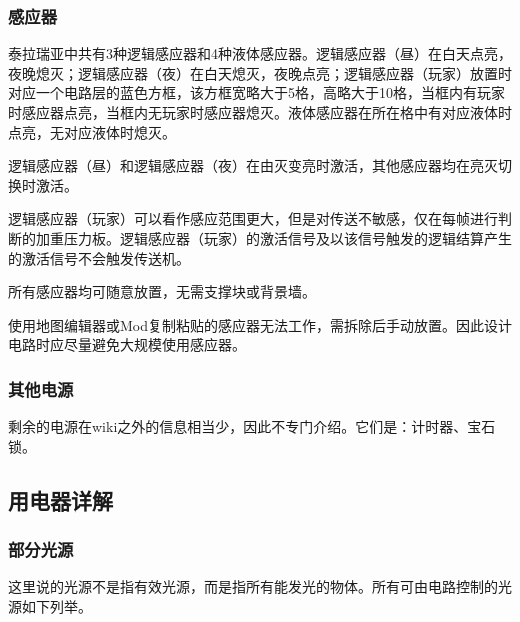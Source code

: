 \subsubsection{感应器}
泰拉瑞亚中共有3种逻辑感应器和4种液体感应器。逻辑感应器（昼）在白天点亮，夜晚熄灭；逻辑感应器（夜）在白天熄灭，夜晚点亮；逻辑感应器（玩家）放置时对应一个电路层的蓝色方框，该方框宽略大于5格，高略大于10格，当框内有玩家时感应器点亮，当框内无玩家时感应器熄灭。液体感应器在所在格中有对应液体时点亮，无对应液体时熄灭。

逻辑感应器（昼）和逻辑感应器（夜）在由灭变亮时激活，其他感应器均在亮灭切换时激活。

逻辑感应器（玩家）可以看作感应范围更大，但是对传送不敏感，仅在每帧进行判断的加重压力板。逻辑感应器（玩家）的激活信号及以该信号触发的逻辑结算产生的激活信号不会触发传送机。

所有感应器均可随意放置，无需支撑块或背景墙。

使用地图编辑器或Mod复制粘贴的感应器无法工作，需拆除后手动放置。因此设计电路时应尽量避免大规模使用感应器。

\subsubsection{其他电源}
剩余的电源在wiki之外的信息相当少，因此不专门介绍。它们是：计时器、宝石锁。

\subsection{用电器详解}\label{sec2}
\minitoc
\subsubsection{部分光源}
这里说的光源不是指有效光源，而是指所有能发光的物体。所有可由电路控制的光源如下列举。


